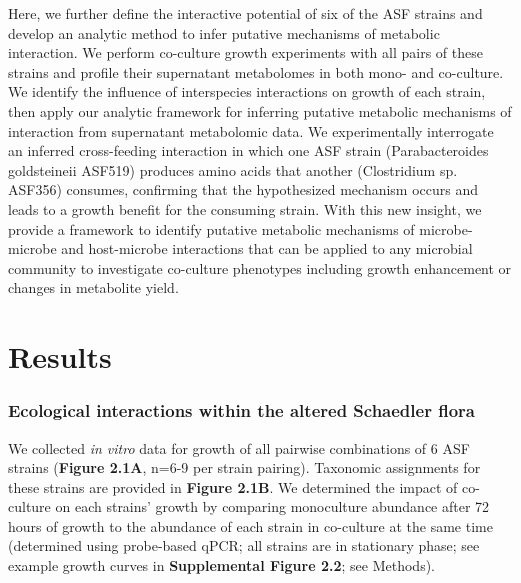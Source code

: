 \documentclass[11pt,onecolumn,notitlepage,openany,twoside]{book}
\begin{document}
\begin{refsection}
Here, we further define the interactive potential of six of the ASF strains and develop an analytic method to infer putative mechanisms of metabolic interaction. We perform co-culture growth experiments with all pairs of these strains and profile their supernatant metabolomes in both mono- and co-culture. We identify the influence of interspecies interactions on growth of each strain, then apply our analytic framework for inferring putative metabolic mechanisms of interaction from supernatant metabolomic data. We experimentally interrogate an inferred cross-feeding interaction in which one ASF strain (Parabacteroides goldsteineii ASF519) produces amino acids that another (Clostridium sp. ASF356) consumes, confirming that the hypothesized mechanism occurs and leads to a growth benefit for the consuming strain. With this new insight, we provide a framework to identify putative metabolic mechanisms of microbe-microbe and host-microbe interactions that can be applied to any microbial community to investigate co-culture phenotypes including growth enhancement or changes in metabolite yield.

\section{Results}
\subsubsection{Ecological interactions within the altered Schaedler flora}

We collected \textit{in vitro} data for growth of all pairwise combinations of 6 ASF strains (\textbf{Figure 2.1A}, n=6-9 per strain pairing). Taxonomic assignments for these strains are provided in \textbf{Figure 2.1B}. We determined the impact of co-culture on each strains’ growth by comparing monoculture abundance after 72 hours of growth to the abundance of each strain in co-culture at the same time (determined using probe-based qPCR; all strains are in stationary phase; see example growth curves in \textbf{Supplemental Figure 2.2}; see Methods).


\end{refsection}
\end{document}
